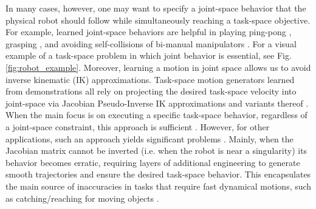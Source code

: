 \documentclass[letterpaper, 10 pt, journal, twoside, fleqn]{IEEEtran}
\begin{document}
In many cases, however, one may want to specify a joint-space behavior that the physical robot should follow while simultaneously reaching a task-space objective. For example, learned joint-space behaviors are helpful in playing ping-pong \cite{huang2016jointly}, grasping \cite{calinon2010learning}, and avoiding self-collisions of bi-manual manipulators \cite{silverio2017learning}. For a visual example of a task-space problem in which joint behavior is essential, see Fig.\ref{fig:robot_example}. Moreover, learning a motion in joint space allows us to avoid inverse kinematic (IK) approximations. Task-space motion generators learned from demonstrations all rely on projecting the desired task-space velocity into joint-space via Jacobian Pseudo-Inverse IK approximations and variants thereof \cite{kelly2006control}. When the main focus is on executing a specific task-space behavior, regardless of a joint-space constraint, this approach is sufficient \cite{figueroa2016HRIrolling,ureche2015taskconst}. However, for other applications, such an approach yields significant problems \cite{buss2004introduction}. Mainly, when the Jacobian matrix cannot be inverted (i.e. when the robot is near a singularity) its behavior becomes erratic, requiring layers of additional engineering to generate smooth trajectories and ensure the desired task-space behavior. This encapsulates the main source of inaccuracies in tasks that require fast dynamical motions, such as catching/reaching for moving objects \cite{7439839,Salehian-RSS-16}. 
\end{document}
